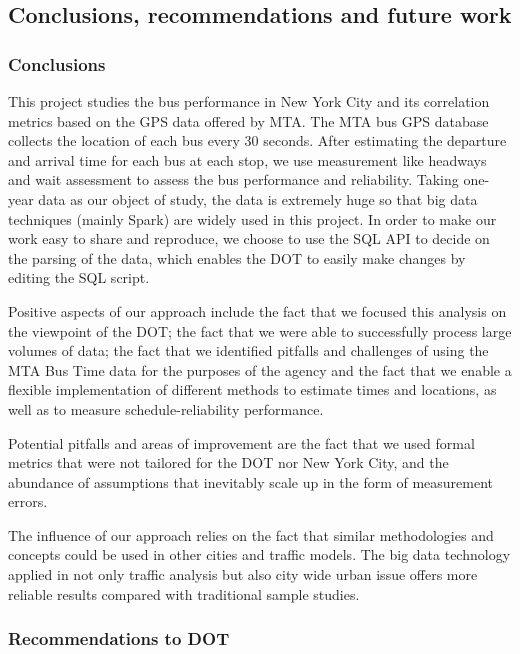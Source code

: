 \documentclass[12pt]{report}
\begin{document}
\subsection{Conclusions, recommendations and future work}

\subsubsection*{Conclusions}


This project studies the bus performance in New York City and its correlation metrics based on the GPS data offered by MTA. The MTA bus GPS database collects the location of each bus every 30 seconds. After estimating the departure and arrival time for each bus at each stop, we use measurement like headways and wait assessment to assess the bus performance and reliability. Taking one-year data as our object of study, the data is extremely huge so that big data techniques (mainly Spark) are widely used in this project. In order to make our work easy to share and reproduce, we choose to use the SQL API to decide on the parsing of the data, which enables the DOT to easily make changes by editing the SQL script. 


Positive aspects of our approach include the fact that we focused this analysis on the viewpoint of the DOT; the fact that we were able to successfully process large volumes of data; the fact that we identified pitfalls and challenges of using the MTA Bus Time data for the purposes of the agency and the fact that we enable a flexible implementation of different methods to estimate times and locations, as well as to measure schedule-reliability performance.


Potential pitfalls and areas of improvement are the fact that we used formal metrics that were not tailored for the DOT nor New York City, and the abundance of assumptions that inevitably scale up in the form of measurement errors.


The influence of our approach relies on the fact that similar methodologies and concepts could be used in other cities and traffic models. The big data technology applied in not only traffic analysis but also city wide urban issue offers more reliable results compared with traditional sample studies.  

\subsubsection*{Recommendations to DOT}
\end{document}
